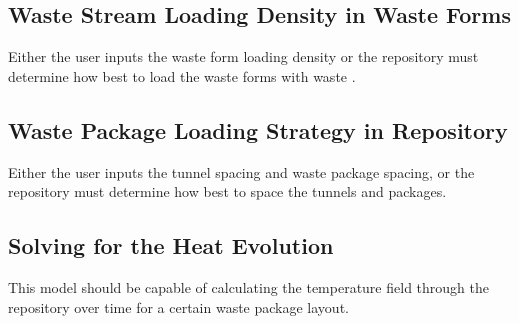 \subsection{Waste Stream Loading Density in Waste Forms}

Either the user inputs the waste form loading density or the repository must 
determine how best to load the waste forms with waste .

\subsection{Waste Package Loading Strategy in Repository}

Either the user inputs the tunnel spacing and waste package spacing, or the 
repository must determine how best to space the tunnels and packages.

\subsection{Solving for the Heat Evolution}

This model should be capable of calculating the temperature field through the 
repository over time for a certain waste package layout. 

